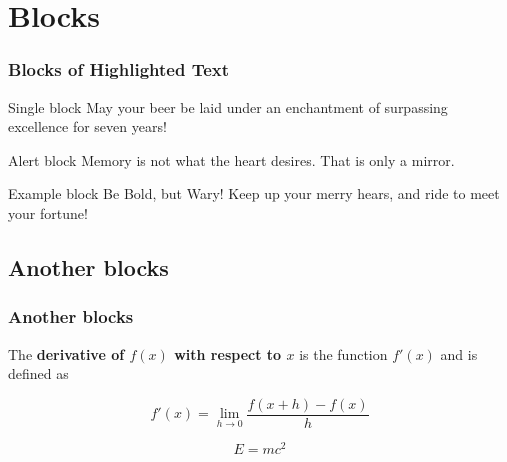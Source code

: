 \documentclass{beamer}
\numberwithin{figure}{section}
\numberwithin{equation}{section}
\begin{document}
\section{Blocks}
\begin{frame}
 \frametitle{Blocks of Highlighted Text}
 \begin{block}{Single block}
  May your beer be laid under an enchantment of surpassing excellence for seven years!
 \end{block}

 \begin{alertblock}{Alert block}
  Memory is not what the heart desires. That is only a mirror.
 \end{alertblock}

 \begin{exampleblock}{Example block}
  Be Bold, but Wary! Keep up your merry hears, and ride to meet your fortune!
 \end{exampleblock}
\end{frame}

\subsection{Another blocks}
\begin{frame}
 \frametitle{Another blocks}
 \begin{definition}[Derivative]
  The \textbf{derivative of $f(x)$ with respect to $x$} is the function $f'(x)$ and is defined as
  
  \begin{equation}
   \label{eqn:definitionDerivative}
   f'(x) = \lim_{h \to 0} \frac{f(x+h) - f(x)}{h}
  \end{equation}
 \end{definition}

 \begin{theorem}
  \begin{equation}
   E = mc^2
  \end{equation}
 \end{theorem}
\end{frame}

\end{document}
